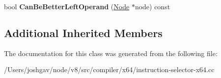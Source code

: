 \begin{DoxyCompactItemize}
\item 
bool {\bfseries Can\+Be\+Better\+Left\+Operand} (\hyperlink{classv8_1_1internal_1_1compiler_1_1_node}{Node} $\ast$node) const \hypertarget{classv8_1_1internal_1_1compiler_1_1_x64_operand_generator_ac449671d09ac1ba4ae77529d1cc37ebc}{}\label{classv8_1_1internal_1_1compiler_1_1_x64_operand_generator_ac449671d09ac1ba4ae77529d1cc37ebc}

\end{DoxyCompactItemize}
\subsection*{Additional Inherited Members}


The documentation for this class was generated from the following file\+:\begin{DoxyCompactItemize}
\item 
/\+Users/joshgav/node/v8/src/compiler/x64/instruction-\/selector-\/x64.\+cc\end{DoxyCompactItemize}
